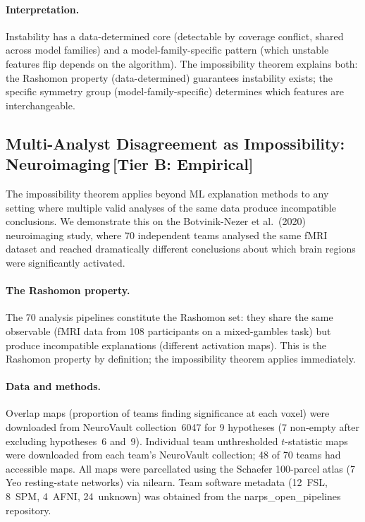 \documentclass[11pt,a4paper]{article}
\begin{document}
\paragraph{Interpretation.}
Instability has a data-determined core (detectable by coverage conflict, shared across model families) and a model-family-specific pattern (which unstable features flip depends on the algorithm).  The impossibility theorem explains both: the Rashomon property (data-determined) guarantees instability exists; the specific symmetry group (model-family-specific) determines which features are interchangeable.

\subsection{Multi-Analyst Disagreement as Impossibility: Neuroimaging\,\textnormal{\normalsize[Tier B: Empirical]}}
\label{sec:narps}

The impossibility theorem applies beyond ML explanation methods to any setting where multiple valid analyses of the same data produce incompatible conclusions.  We demonstrate this on the Botvinik-Nezer et al.\ (2020) neuroimaging study, where 70 independent teams analysed the same fMRI dataset and reached dramatically different conclusions about which brain regions were significantly activated.

\paragraph{The Rashomon property.}
The 70 analysis pipelines constitute the Rashomon set: they share the same observable (fMRI data from 108 participants on a mixed-gambles task) but produce incompatible explanations (different activation maps).  This is the Rashomon property by definition; the impossibility theorem applies immediately.

\paragraph{Data and methods.}
Overlap maps (proportion of teams finding significance at each voxel) were downloaded from NeuroVault collection~6047 for 9 hypotheses (7 non-empty after excluding hypotheses~6 and~9).  Individual team unthresholded $t$-statistic maps were downloaded from each team's NeuroVault collection; 48 of 70 teams had accessible maps.  All maps were parcellated using the Schaefer 100-parcel atlas (7 Yeo resting-state networks) via nilearn.  Team software metadata (12~FSL, 8~SPM, 4~AFNI, 24~unknown) was obtained from the narps\_open\_pipelines repository.
\end{document}
